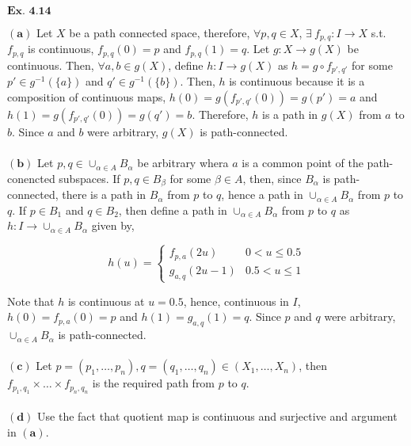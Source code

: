 \documentclass{article}
\begin{document}
\vspace{0.2in}

${\textbf{Ex. 4.14}}$

$\mathbf{(a)}$ Let $X$ be a path connected space, therefore, $\forall p,q \in X$, $\exists\ f_{p,q}:I\rightarrow X$ s.t. $f_{p,q}$ is continuous, $f_{p,q}(0) = p$ and $f_{p,q}(1) = q$. Let $g: X \rightarrow g(X)$ be continuous. Then, $\forall a,b \in g(X)$, define $h:I \rightarrow g(X)$ as $h = g\circ f_{p',q'}$ for some $p' \in g^{-1}(\{a\})$ and $q' \in g^{-1}(\{b\})$. Then, $h$ is continuous because it is a composition of continuous maps, $h(0) = g(f_{p',q'}(0)) = g(p') = a$ and $h(1) = g(f_{p',q'}(0)) = g(q') = b$. Therefore, $h$ is a path in $g(X)$ from $a$ to $b$. Since $a$ and $b$ were arbitrary, $g(X)$ is path-connected.\\~\\

$\mathbf{(b)}$ Let $p,q \in \cup_{\alpha \in A}B_{\alpha}$ be arbitrary whera $a$ is a common point of the path-conencted subspaces. If $p,q \in B_{\beta}$ for some $\beta \in A$, then, since $B_{\alpha}$ is path-connected, there is a path in $B_{\alpha}$ from $p$ to $q$, hence a path in $\cup_{\alpha \in A}B_{\alpha}$ from $p$ to $q$. If $p \in B_{1}$ and $q \in B_{2}$, then define a path in $\cup_{\alpha \in A}B_{\alpha}$ from $p$ to $q$ as $h:I \rightarrow \cup_{\alpha \in A}B_{\alpha}$ given by,

$$h(u) = \left\{\begin{matrix}f_{p,a}(2u) & 0 < u \leq 0.5 \\ g_{a,q}(2u-1) & 0.5 < u \leq 1\end{matrix}\right.$$

Note that $h$ is continuous at $u=0.5$, hence, continuous in $I$, $h(0) = f_{p,a}(0) = p$ and $h(1) = g_{a,q}(1) = q$. Since $p$ and $q$ were arbitrary, $\cup_{\alpha \in A}B_{\alpha}$ is path-connected.\\~\\

$\mathbf{(c)}$ Let $p = (p_1,\ldots,p_n), q = (q_1,\ldots,q_n) \in (X_1,\ldots,X_n)$, then $f_{p_1,q_1} \times \ldots \times f_{p_n,q_n}$ is the required path from $p$ to $q$.\\~\\

$\mathbf{(d)}$ Use the fact that quotient map is continuous and surjective and argument in $\mathbf{(a)}$. 

\vspace{0.2in}
\end{document}
